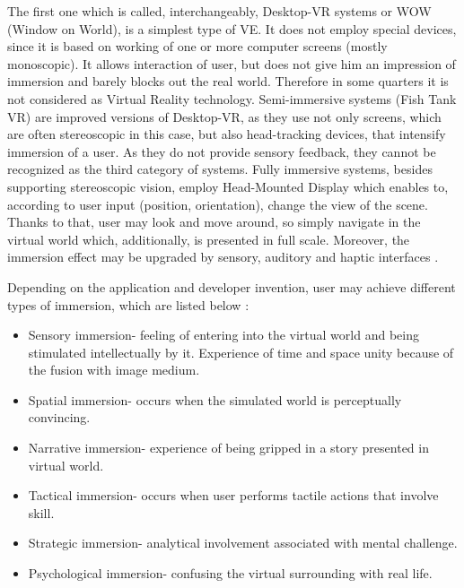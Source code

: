 The first one which is called, interchangeably, Desktop-VR systems or WOW (Window on World), is a simplest type of VE. It does not employ special devices, since it is based on working of one or more computer screens (mostly monoscopic). It allows interaction of user, but does not give him an impression of immersion and barely blocks out the real world. Therefore in some quarters it is not considered as Virtual Reality technology. Semi-immersive systems (Fish Tank VR) are improved versions of Desktop-VR, as they use not only screens, which are often stereoscopic in this case, but also head-tracking devices, that intensify immersion of a user. As they do not provide sensory feedback, they cannot be recognized as the third category of systems. Fully immersive systems, besides supporting stereoscopic vision, employ Head-Mounted Display which enables to, according to user input (position, orientation), change the view of the scene. Thanks to that, user may look and move around, so simply navigate in the virtual world which, additionally, is presented in full scale. Moreover, the immersion effect may be upgraded by sensory, auditory and haptic interfaces \cite{Mandal13, Brooks99}. 

Depending on the application and developer invention, user may achieve different types of immersion, which are listed below \cite{Mandal13}:
\begin{itemize}
\item Sensory immersion- feeling of entering into the virtual world and being stimulated intellectually by it. Experience of time and space unity because of the fusion with image medium.
\item Spatial immersion- occurs when the simulated world is perceptually convincing.
\item Narrative immersion- experience of being gripped in a story presented in virtual world.
\item Tactical immersion- occurs when user performs tactile actions that involve skill.
\item Strategic immersion- analytical involvement associated with mental challenge.
\item Psychological immersion- confusing the virtual surrounding with real life.
\end{itemize}

